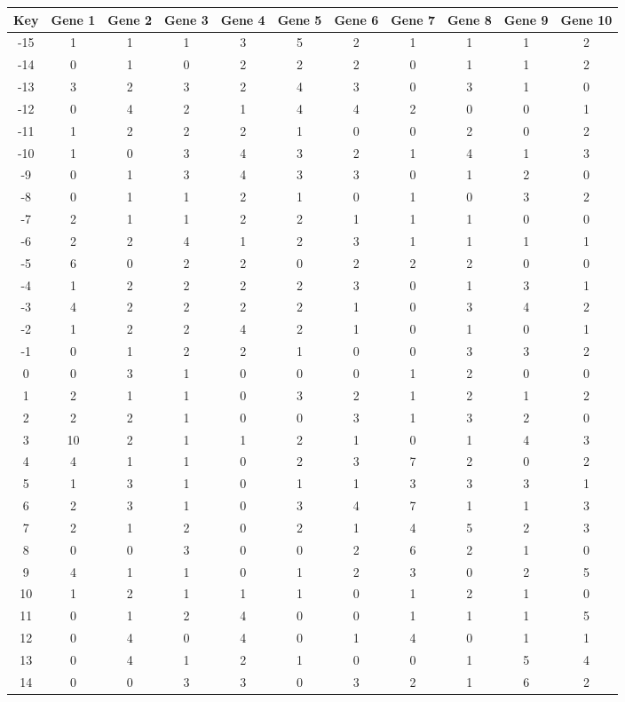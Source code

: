 \begin{tabular}{|c|c|c|c|c|c|c|c|c|c|c|}
\hline
Key & Gene 1 & Gene 2 & Gene 3 & Gene 4 & Gene 5 & Gene 6 & Gene 7 & Gene 8 & Gene 9 & Gene 10 \\
\hline
-15 & 1 & 1 & 1 & 3 & 5 & 2 & 1 & 1 & 1 & 2 \\
-14 & 0 & 1 & 0 & 2 & 2 & 2 & 0 & 1 & 1 & 2 \\
-13 & 3 & 2 & 3 & 2 & 4 & 3 & 0 & 3 & 1 & 0 \\
-12 & 0 & 4 & 2 & 1 & 4 & 4 & 2 & 0 & 0 & 1 \\
-11 & 1 & 2 & 2 & 2 & 1 & 0 & 0 & 2 & 0 & 2 \\
-10 & 1 & 0 & 3 & 4 & 3 & 2 & 1 & 4 & 1 & 3 \\
-9 & 0 & 1 & 3 & 4 & 3 & 3 & 0 & 1 & 2 & 0 \\
-8 & 0 & 1 & 1 & 2 & 1 & 0 & 1 & 0 & 3 & 2 \\
-7 & 2 & 1 & 1 & 2 & 2 & 1 & 1 & 1 & 0 & 0 \\
-6 & 2 & 2 & 4 & 1 & 2 & 3 & 1 & 1 & 1 & 1 \\
-5 & 6 & 0 & 2 & 2 & 0 & 2 & 2 & 2 & 0 & 0 \\
-4 & 1 & 2 & 2 & 2 & 2 & 3 & 0 & 1 & 3 & 1 \\
-3 & 4 & 2 & 2 & 2 & 2 & 1 & 0 & 3 & 4 & 2 \\
-2 & 1 & 2 & 2 & 4 & 2 & 1 & 0 & 1 & 0 & 1 \\
-1 & 0 & 1 & 2 & 2 & 1 & 0 & 0 & 3 & 3 & 2 \\
0 & 0 & 3 & 1 & 0 & 0 & 0 & 1 & 2 & 0 & 0 \\
1 & 2 & 1 & 1 & 0 & 3 & 2 & 1 & 2 & 1 & 2 \\
2 & 2 & 2 & 1 & 0 & 0 & 3 & 1 & 3 & 2 & 0 \\
3 & 10 & 2 & 1 & 1 & 2 & 1 & 0 & 1 & 4 & 3 \\
4 & 4 & 1 & 1 & 0 & 2 & 3 & 7 & 2 & 0 & 2 \\
5 & 1 & 3 & 1 & 0 & 1 & 1 & 3 & 3 & 3 & 1 \\
6 & 2 & 3 & 1 & 0 & 3 & 4 & 7 & 1 & 1 & 3 \\
7 & 2 & 1 & 2 & 0 & 2 & 1 & 4 & 5 & 2 & 3 \\
8 & 0 & 0 & 3 & 0 & 0 & 2 & 6 & 2 & 1 & 0 \\
9 & 4 & 1 & 1 & 0 & 1 & 2 & 3 & 0 & 2 & 5 \\
10 & 1 & 2 & 1 & 1 & 1 & 0 & 1 & 2 & 1 & 0 \\
11 & 0 & 1 & 2 & 4 & 0 & 0 & 1 & 1 & 1 & 5 \\
12 & 0 & 4 & 0 & 4 & 0 & 1 & 4 & 0 & 1 & 1 \\
13 & 0 & 4 & 1 & 2 & 1 & 0 & 0 & 1 & 5 & 4 \\
14 & 0 & 0 & 3 & 3 & 0 & 3 & 2 & 1 & 6 & 2 \\
\hline
\end{tabular}